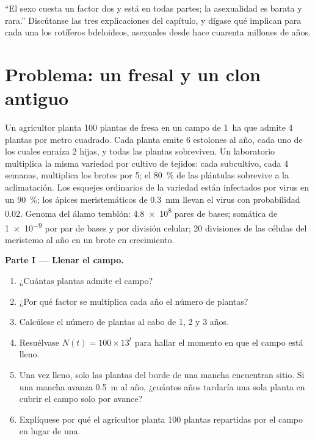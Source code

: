 \begin{exercise}[$\star\star\star$]\label{exo:b2:asexual-reproduction:12}
``El sexo cuesta un factor dos y está en todas partes; la asexualidad es
barata y rara.'' Discútanse las tres explicaciones del capítulo, y
dígase qué implican para cada una los rotíferos bdeloideos, asexuales
desde hace cuarenta millones de años.
\end{exercise}

\section{Problema: un fresal y un clon antiguo}

\begin{problem}
\label{pb:b2:asexual-reproduction:1}
Un agricultor planta \num{100} plantas de fresa en un campo de
\qty{1}{ha} que admite \num{4} plantas por metro cuadrado. Cada planta
emite \num{6} estolones al año, cada uno de los cuales enraíza \num{2}
hijas, y todas las plantas sobreviven. Un laboratorio multiplica la misma
variedad por cultivo de tejidos: cada subcultivo, cada \num{4} semanas,
multiplica los brotes por \num{5}; el \qty{80}{\%} de las plántulas
sobrevive a la aclimatación. Los esquejes ordinarios de la variedad
están infectados por virus en un \qty{90}{\%}; los ápices meristemáticos
de \qty{0.3}{mm} llevan el virus con probabilidad $0.02$. Genoma del
álamo temblón: \qty{4.8e8}{} pares de bases;  somática
de \qty{1e-9}{} por par de bases y por división celular; \num{20}
divisiones de las células del meristemo al año en un brote en
crecimiento.

\medskip
\noindent\textbf{Parte I --- Llenar el campo.}
\begin{enumerate}
  \item ¿Cuántas plantas admite el campo?
  \item ¿Por qué factor se multiplica cada año el número de plantas?
  \item Calcúlese el número de plantas al cabo de 1, 2 y 3 años.
  \item Resuélvase $N(t) = 100\times 13^{t}$ para hallar el momento en
        que el campo está lleno.
  \item Una vez lleno, solo las plantas del borde de una mancha encuentran
        sitio. Si una mancha avanza \qty{0.5}{m} al año, ¿cuántos años
        tardaría una sola planta en cubrir el campo solo por avance?
  \item Explíquese por qué el agricultor planta \num{100} plantas
        repartidas por el campo en lugar de una.
\end{enumerate}


\end{problem}
